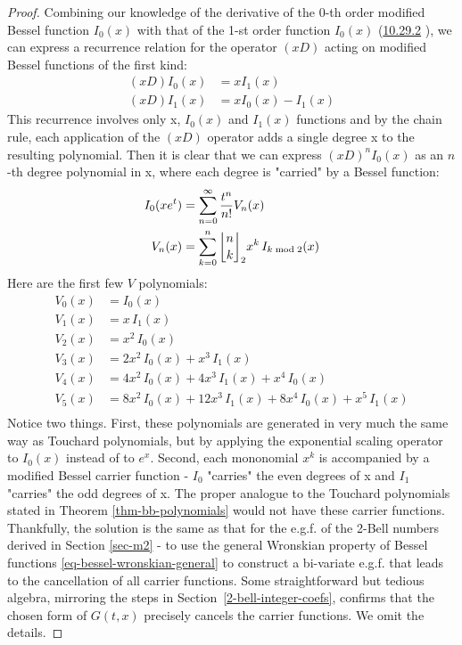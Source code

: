 \documentclass[a4paper]{amsart}
\newcommand{\mStirling}[0]{\genfrac{\lfloor}{\rfloor}{0pt}{}}
\begin{document}
\begin{proof}
Combining our knowledge of the derivative of the 0-th order modified Bessel function $I_0(x)$ with that of the 1-st order function $I_0(x)$ (\href{https://dlmf.nist.gov/10.29.E2}{10.29.2} \cite{NIST:DLMF}), we can express a recurrence relation for the operator $(xD)$ acting on modified Bessel functions of the first kind:
\begin{equation}
    \begin{aligned}
        (xD)I_0(x) &= x I_1(x) \\
        (xD)I_1(x) &= x I_0(x)-I_1(x)
    \end{aligned}
\end{equation}
This recurrence involves only x, $I_0(x)$ and $I_1(x)$ functions and by the chain rule, each application of the $(xD)$ operator adds a single degree x to the resulting polynomial. Then it is clear that we can express $(xD)^nI_0(x)$ as an $n$-th degree polynomial in x, where each degree is "carried" by a Bessel function: 
\begin{equation}
    \begin{aligned}
        I_0(xe^t) &= \sum_{n=0}^\infty\frac{t^n}{n!}V_n(x) \\
        V_n(x) &= \sum_{k=0}^{n} \mStirling{n}{k}_2 x^k\, I_{k \bmod 2}(x)
    \end{aligned}
\end{equation}
Here are the first few $V$ polynomials:
\[
\begin{aligned}
V_0(x) &= I_0(x) \\
V_1(x) &= x\,I_1(x) \\
V_2(x) &= x^2\,I_0(x) \\
V_3(x) &= 2x^2\,I_0(x) + x^3\,I_1(x) \\
V_4(x) &= 4x^2\,I_0(x) + 4x^3\,I_1(x) + x^4\,I_0(x) \\
V_5(x) &= 8x^2\,I_0(x) + 12x^3\,I_1(x) + 8x^4\,I_0(x) + x^5\,I_1(x) \\
\end{aligned}
\]
Notice two things. First, these polynomials are generated in very much the same way as Touchard polynomials, but by applying the exponential scaling operator to $I_0(x)$ instead of to $e^x$. Second, each mononomial $x^k$ is accompanied by a modified Bessel carrier function - $I_0$ "carries" the even degrees of x and $I_1$ "carries" the odd degrees of x. The proper analogue to the Touchard polynomials stated in Theorem \ref{thm-bb-polynomials} would not have these carrier functions. Thankfully, the solution is the same as that for the e.g.f. of the 2-Bell numbers derived in Section \ref{sec-m2} - to use the general Wronskian property of Bessel functions \eqref{eq-bessel-wronskian-general} to construct a bi-variate e.g.f. that leads to the cancellation of all carrier functions. Some straightforward but tedious algebra, mirroring the steps in Section~\ref{2-bell-integer-coefs}, confirms that the chosen form of $G(t,x)$ precisely cancels the carrier functions. We omit the details.
\end{proof}
\end{document}
